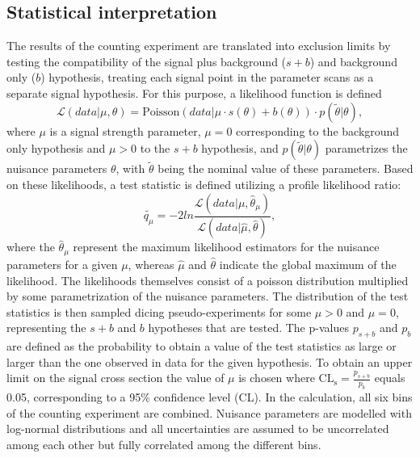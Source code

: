 \subsection{Statistical interpretation}
The results of the counting experiment are translated into exclusion limits by testing the compatibility of the signal plus background ($s+b$) and background only ($b$) hypothesis, treating each signal point in the parameter scans as a separate signal hypothesis. For this purpose, a likelihood function is defined~\cite{HiggsTool1}
\begin{equation}
\mathcal{L}(data|\mu,\theta) = \text{Poisson}(data|\mu\cdot s(\theta) + b(\theta))\cdot p(\tilde{\theta}|\theta),
\end{equation}
where $\mu$ is a signal strength parameter, $\mu = 0$ corresponding to the background only hypothesis and $\mu > 0$ to the  $s+b$ hypothesis, and $p(\tilde{\theta}|\theta)$ parametrizes the nuisance parameters $\theta$, with $\tilde{\theta}$ being the nominal value of these parameters. Based on these likelihoods, a test statistic is defined utilizing a profile likelihood ratio: 
\begin{equation}
\tilde{q_{\mu}} = -2 ln\frac{\mathcal{L}(data|\mu,\hat{\theta}_\mu)}{\mathcal{L}(data|\hat{\mu},\hat{\theta})},
\end{equation}
where the $\hat{\theta}_\mu$ represent the maximum likelihood estimators for the nuisance parameters for a given $\mu$, whereas $\hat{\mu}$ and $\hat{\theta}$ indicate the global maximum of the likelihood. The likelihoods themselves consist of a poisson distribution multiplied by some parametrization of the nuisance parameters. The distribution of the test statistics is then sampled dicing pseudo-experiments for some $\mu > 0$ and $\mu = 0$, representing the $s+b$ and $b$ hypotheses that are tested. The p-values $p_{s+b}$ and $p_{b}$ are defined as the probability to obtain a value of the test statistics as large or larger than the one observed in data for the given hypothesis. To obtain an upper limit on the signal cross section the value of $\mu$ is chosen where $\mathrm{CL}_{\mathrm{s}} = \frac{p_{s+b}}{p_b}$ equals 0.05, corresponding to a 95\% confidence level (CL). In the calculation, all six bins of the counting experiment are combined. Nuisance parameters are modelled with log-normal distributions and all uncertainties are assumed to be uncorrelated among each other but fully correlated among the different bins.


